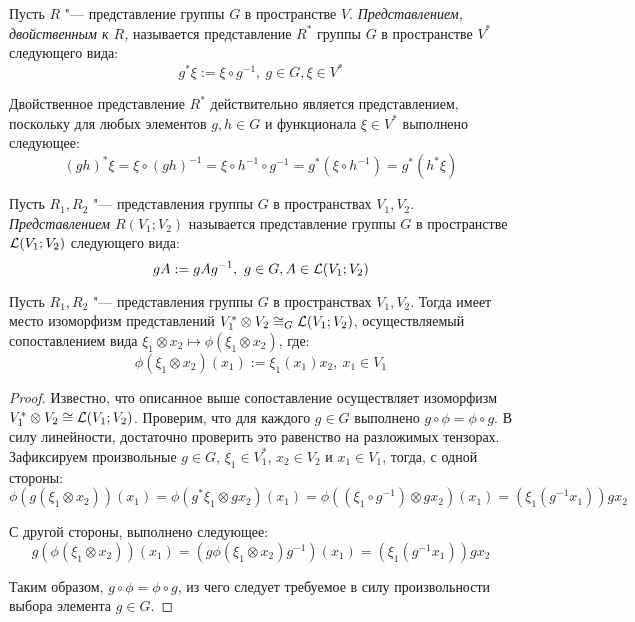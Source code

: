 \begin{definition}
	Пусть $R$ "--- представление группы $G$ в пространстве $V$. \textit{Представлением, двойственным к $R$,} называется представление $R^*$ группы $G$ в пространстве $V^*$ следующего вида:
	\[g^*\xi := \xi\circ g^{-1},~g \in G, \xi \in V^*\]
\end{definition}

\begin{note}
	Двойственное представление $R^*$ действительно является представлением, поскольку для любых элементов $g, h \in G$ и функционала $\xi \in V^*$ выполнено следующее:
	\[(gh)^*\xi = \xi \circ (gh)^{-1} = \xi \circ h^{-1} \circ g^{-1} = g^*(\xi \circ h^{-1})= g^*(h^*\xi)\]
\end{note}

\begin{definition}
	Пусть $R_1, R_2$ "--- представления группы $G$ в пространствах $V_1, V_2$. \textit{Представлением $R(V_1; V_2)$} называется представление группы $G$ в пространстве $\mathcal L(V_1; V_2)$ следующего вида:
	\[gA := gAg^{-1},~g \in G, A \in \mathcal L(V_1; V_2)\]
\end{definition}

\begin{proposition}
	Пусть $R_1, R_2$ "--- представления группы $G$ в пространствах $V_1, V_2$. Тогда имеет место изоморфизм представлений $V_1^* \otimes V_2 \cong_G \mathcal L(V_1; V_2)$, осуществляемый сопоставлением вида $\xi_1 \otimes x_2 \mapsto \phi(\xi_1 \otimes x_2)$, где:
	\[\phi(\xi_1 \otimes x_2)(x_1) := \xi_1(x_1)x_2,~x_1 \in V_1\]
\end{proposition}

\begin{proof}
	Известно, что описанное выше сопоставление осуществляет изоморфизм $V_1^* \otimes V_2 \cong \mathcal L(V_1; V_2)$. Проверим, что для каждого $g \in G$ выполнено $g \circ \phi = \phi \circ g$. В силу линейности, достаточно проверить это равенство на разложимых тензорах. Зафиксируем произвольные $g \in G$, $\xi_1 \in V_1^*$, $x_2 \in V_2$ и $x_1 \in V_1$, тогда, с одной стороны:
	\[\phi(g(\xi_1 \otimes x_2))(x_1) = \phi(g^*\xi_1 \otimes gx_2)(x_1) = \phi((\xi_1 \circ g^{-1}) \otimes gx_2)(x_1) = (\xi_1(g^{-1}x_1))gx_2\]
	
	С другой стороны, выполнено следующее:
	\[g(\phi(\xi_1 \otimes x_2))(x_1) = (g\phi(\xi_1 \otimes x_2)g^{-1})(x_1) = (\xi_1(g^{-1}x_1))gx_2\]
	
	Таким образом, $g \circ \phi = \phi \circ g$, из чего следует требуемое в силу произвольности выбора элемента $g \in G$.
\end{proof}

